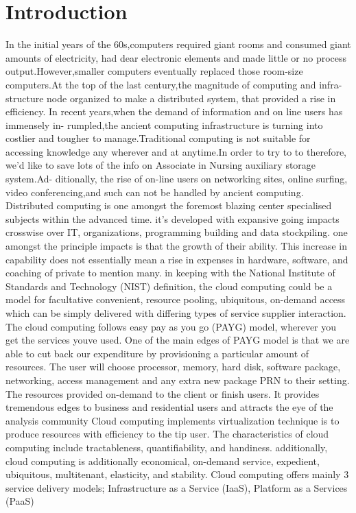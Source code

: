 \section{Introduction}
In the initial years of the 60s,computers required giant rooms and consumed giant amounts of electricity, had dear electronic elements and made little or no process output.However,smaller computers eventually replaced those room-size computers.At the top of the last century,the magnitude of computing and infra- structure node organized to make a distributed system, that provided a rise in efficiency. In recent years,when the demand of information and on line users has immensely in- rumpled,the ancient computing infrastructure is turning into costlier and tougher to manage.Traditional computing is not suitable for accessing knowledge any wherever and at anytime.In order to try to to therefore, we'd like to save lots of the info on Associate in Nursing auxiliary storage system.Ad- ditionally, the rise of on-line users on networking sites, online surfing, video conferencing,and such can not be handled by ancient computing.
Distributed computing is one amongst the foremost blazing center specialised subjects within the advanced time. it's developed with expansive going impacts crosswise over IT, organizations, programming building and data stockpiling. one amongst the principle impacts is that the growth of their ability. This increase in capability does not essentially mean a rise in expenses in hardware, software, and coaching of private to mention many. in keeping with the National Institute of Standards and Technology (NIST) definition, the cloud computing could be a model for facultative convenient, resource pooling, ubiquitous, on-demand access which can be simply delivered with differing types of service supplier interaction. The cloud computing follows easy pay as you go (PAYG) model, wherever you get the services youve used. One of the main edges of PAYG model is that we are able to cut back our expenditure by provisioning a particular amount of resources. The user will choose processor, memory, hard disk, software package, networking, access management and any extra new package PRN to their setting. The resources provided on-demand to the client or finish users. It provides tremendous edges to business and residential users and attracts the eye of the analysis community Cloud computing implements virtualization technique is to produce resources with efficiency to the tip user. The characteristics of cloud computing include tractableness, quantifiability, and handiness. additionally, cloud computing is additionally economical, on-demand service, expedient, ubiquitous, multitenant, elasticity, and stability. Cloud computing offers mainly 3 service delivery models; Infrastructure as a Service (IaaS), Platform as a Services (PaaS)
